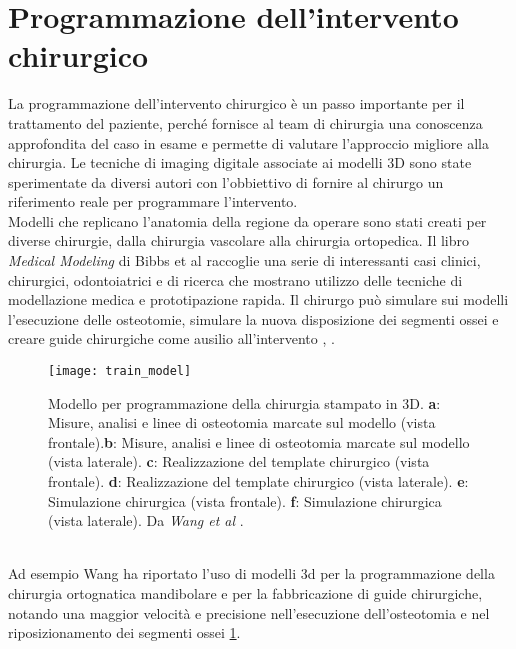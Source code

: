\section{Programmazione dell'intervento chirurgico} 
La programmazione dell'intervento chirurgico è un passo importante per il trattamento del paziente, perché fornisce al team di chirurgia una conoscenza approfondita del caso in esame e permette di valutare l'approccio migliore alla chirurgia. Le tecniche di imaging digitale associate ai modelli 3D sono state sperimentate da diversi autori con l'obbiettivo di fornire al chirurgo un riferimento reale per programmare l'intervento.\\ Modelli che replicano l'anatomia della regione da operare sono stati creati per diverse chirurgie, dalla chirurgia vascolare alla chirurgia ortopedica. Il libro \emph{Medical Modeling} di Bibbs et al \parencite{Reference1} raccoglie una serie di interessanti casi clinici, chirurgici, odontoiatrici e di ricerca che mostrano utilizzo delle tecniche di modellazione medica e prototipazione rapida. Il chirurgo può simulare sui modelli l'esecuzione delle osteotomie, simulare la nuova disposizione dei segmenti ossei e creare guide chirurgiche come ausilio all'intervento \parencite{Reference77}, \parencite{Reference78}.
\begin{figure}[h]
\vspace{-10pt}
	\begin{center}
	\texttt{[image: train\_model]}
    \caption{Modello per programmazione della chirurgia stampato in 3D.
\textbf{a}: Misure, analisi e linee di osteotomia marcate sul modello (vista frontale).\textbf{b}: Misure, analisi e linee di osteotomia marcate sul modello (vista laterale). \textbf{c}: Realizzazione del template chirurgico (vista frontale). \textbf{d}: Realizzazione del template chirurgico (vista laterale). \textbf{e}: Simulazione chirurgica (vista frontale). \textbf{f}: Simulazione chirurgica (vista laterale). Da \emph{Wang et al} \parencite{Reference20}.}
    \label{fig:train_model}
    \end{center}
\vspace{-20pt}
\end{figure}
\\ 
Ad esempio Wang \parencite{Reference109} ha riportato l'uso di modelli 3d per la programmazione della chirurgia ortognatica mandibolare e per la fabbricazione di guide chirurgiche, notando una maggior velocità e precisione nell'esecuzione dell'osteotomia e nel riposizionamento dei segmenti ossei \ref{fig:train_model}.\\
